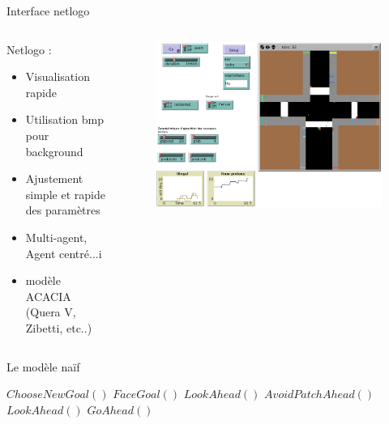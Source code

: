 \documentclass[hyperref={pdfpagelabel=false},8pt, handout=show,show notes]{beamer}
\begin{document}
\begin{frame}{Interface netlogo}
\begin{columns}
\begin{column}{.45\textwidth}
Netlogo :
\begin{itemize}
 \item Visualisation rapide
 \item Utilisation bmp pour background
 \item Ajustement simple et rapide des param\`etres
 \item Multi-agent, Agent centr\'e...i
 \item mod\`ele ACACIA (Quera V, Zibetti, etc..)
\end{itemize}

\end{column}

\begin{column}{.5\textwidth}
\begin{figure}
 \centering
 \includegraphics[width=\textwidth]{images/netlogo-printscreen}
\end{figure}
\end{column}

\end{columns}
 
\end{frame}

\begin{frame}{Le mod\`ele na\"if} 


\begin{algorithmic}
    \Loop
    \State $ChooseNewGoal()$
    \EndIf
    \State $FaceGoal()$
    \State $LookAhead()$
    \State $AvoidPatchAhead()$
    \State $LookAhead()$
    \EndWhile
    \State $GoAhead()$ 
    \EndLoop
\EndFunction

\end{algorithmic}

 \end{frame}
\end{document}
